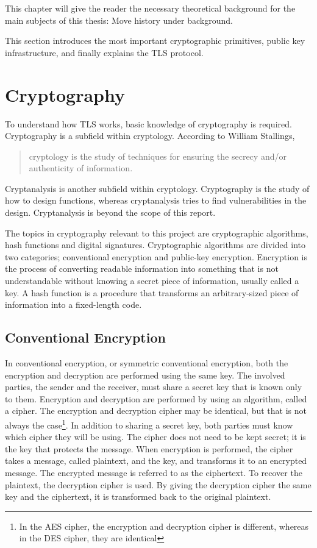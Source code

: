 \documentclass[12pt,a4paper,titlepage]{report}
\begin{document}
This chapter will give the reader the necessary theoretical background for the
main subjects of this thesis: 
Move history under background.

\label{sec:theory}
This section introduces the most important cryptographic primitives, public key infrastructure, and finally explains the TLS protocol.

\section{Cryptography}
To understand how TLS works, basic knowledge of cryptography is required. Cryptography is a subfield within cryptology. According to William Stallings\cite{stallings}, 
\begin{quote}
cryptology is the study of techniques for ensuring the secrecy and/or authenticity of information.
\end{quote}
Cryptanalysis is another subfield within cryptology. Cryptography is the study of how to design functions, whereas cryptanalysis tries to find vulnerabilities in the design. Cryptanalysis is beyond the scope of this report.

The topics in cryptography relevant to this project are cryptographic algorithms, hash functions and digital signatures. Cryptographic algorithms are divided into two categories; conventional encryption and public-key encryption. Encryption is the process of converting readable information into something that is not understandable without knowing a secret piece of information, usually called a key. A hash function is a procedure that transforms an arbitrary-sized piece of information into a fixed-length code. 

\subsection{Conventional Encryption}
In conventional encryption, or symmetric conventional encryption, both the encryption and decryption are performed using the same key. The involved parties, the sender and the receiver, must share a secret key that is known only to them. Encryption and decryption are performed by using an algorithm, called a cipher. The encryption and decryption cipher may be identical, but that is not always the case\footnote{In the AES cipher, the encryption and decryption cipher is different, whereas in the DES cipher, they are identical}. In addition to sharing a secret key, both parties must know which cipher they will be using. The cipher does not need to be kept secret; it is the key that protects the message. When encryption is performed, the cipher takes a message, called plaintext, and the key, and transforms it to an encrypted message. The encrypted message is referred to as the ciphertext. To recover the plaintext, the decryption cipher is used. By giving the decryption cipher the same key and the ciphertext, it is transformed back to the original plaintext. \cite{stallings}
\end{document}
